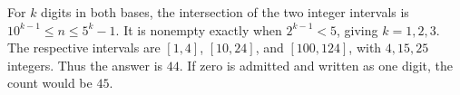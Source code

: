 For $k$ digits in both bases, the intersection of the two integer intervals is $10^{k-1}\le n\le 5^k-1$. It is nonempty exactly when $2^{k-1}<5$, giving $k=1,2,3$. The respective intervals are $[1,4]$, $[10,24]$, and $[100,124]$, with $4,15,25$ integers. Thus the answer is $\boxed{44}$. If zero is admitted and written as one digit, the count would be $45$.
